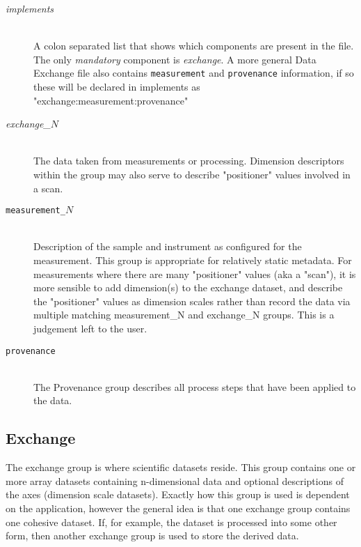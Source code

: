 \begin{description}
\item[\emph{implements}] \hfill \\
{A colon separated list that shows which components are present in the file. The
only \emph{mandatory} component is \emph{exchange}. A more general Data Exchange
file also contains {\tt measurement} and {\tt provenance} information, if so 
these will be declared in implements as "exchange:measurement:provenance"}

\item[\emph{exchange\_$N$}] \hfill \\
{The data taken from measurements or processing. Dimension descriptors within the group may also serve to describe "positioner" values involved in a scan. }

\item[\tt{measurement\_$N$}] \hfill \\
{Description of the sample and instrument as configured for the measurement. This group is appropriate for relatively static metadata.  For measurements where there are many "positioner" values (aka a "scan"), it is more sensible to add dimension(s) to the exchange dataset, and describe the "positioner" values as dimension scales rather than record the data via multiple matching measurement\_N and exchange\_N groups. This is a judgement left to the user.}

\item[\tt{provenance}] \hfill \\
{The Provenance group describes all process steps that have been applied to the
data.}
\end{description}

\clearpage

\subsection{Exchange}
\label {sec:exchange}
The exchange group is where scientific datasets reside. This group
contains one or more array datasets containing n-dimensional data and optional 
descriptions of the axes (dimension scale datasets). Exactly how this group is
used is dependent on the application, however the general idea is that
one exchange group contains one cohesive dataset. If, for example, the
dataset is processed into some other form, then another exchange group is
used to store the derived data.

